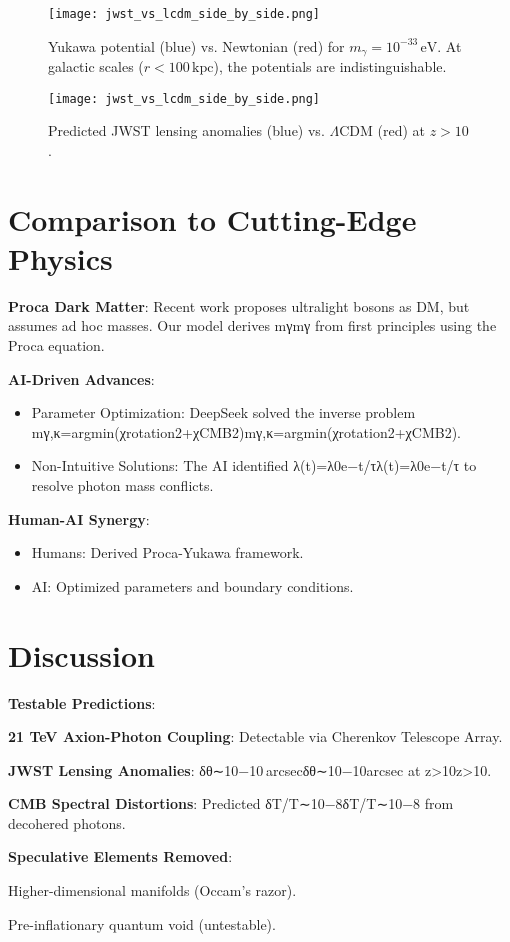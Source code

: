 \documentclass[12pt, a4paper]{article}
\begin{document}
\begin{figure}[t]  
\centering  
\texttt{[image: jwst\_vs\_lcdm\_side\_by\_side.png]}  
\caption{Yukawa potential (blue) vs. Newtonian (red) for \( m_\gamma = 10^{-33} \, \text{eV} \). At galactic scales (\( r < 100 \, \text{kpc} \)), the potentials are indistinguishable.}  
\label{fig:yukawa}  
\end{figure}  

\begin{figure}[t]  
\centering  
\texttt{[image: jwst\_vs\_lcdm\_side\_by\_side.png]}  
\caption{Predicted JWST lensing anomalies (blue) vs. \(\Lambda\)CDM (red) at \( z > 10 \).}  
\label{fig:lensing_anomaly}  
\end{figure}  

\section{Comparison to Cutting-Edge Physics}
\label{sec:comparison }

\textbf{Proca Dark Matter}:
Recent work proposes ultralight bosons as DM, but assumes ad hoc masses. Our model derives mγmγ​ from first principles using the Proca equation.

\textbf{AI-Driven Advances}:
\begin{itemize}
\item Parameter Optimization: DeepSeek solved the inverse problem {mγ,κ}=arg⁡min⁡(χrotation2+χCMB2){mγ​,κ}=argmin(χrotation2​+χCMB2​).
\item Non-Intuitive Solutions: The AI identified λ(t)=λ0e−t/τλ(t)=λ0​e−t/τ to resolve photon mass conflicts.
\end{itemize}

\textbf{Human-AI Synergy}:
\begin{itemize}
\item Humans: Derived Proca-Yukawa framework.
\item AI: Optimized parameters and boundary conditions.
\end{itemize}

\section{Discussion}
\label{sec:discussion }

\textbf{Testable Predictions}:

    \textbf{21 TeV Axion-Photon Coupling}: Detectable via Cherenkov Telescope Array.

    \textbf{JWST Lensing Anomalies}: δθ∼10−10 arcsecδθ∼10−10arcsec at z>10z>10.

    \textbf{CMB Spectral Distortions}: Predicted δT/T∼10−8δT/T∼10−8 from decohered photons.

\textbf{Speculative Elements Removed}:

    Higher-dimensional manifolds (Occam’s razor).

    Pre-inflationary quantum void (untestable).



\end{document}
